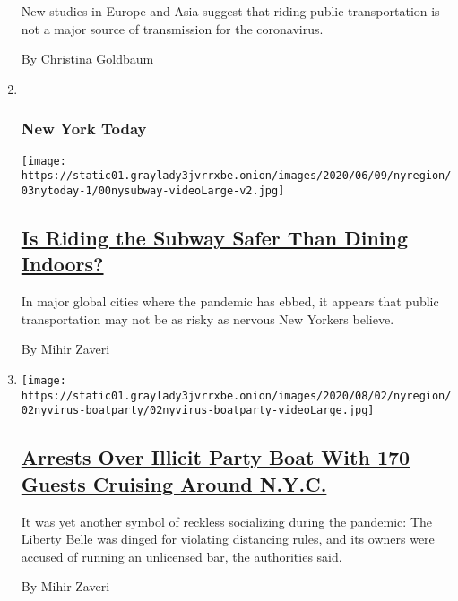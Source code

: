 \begin{enumerate}
  New studies in Europe and Asia suggest that riding public
  transportation is not a major source of transmission for the
  coronavirus.

  By Christina Goldbaum
\item ~
  \hypertarget{new-york-today}{%
  \subsubsection{New York Today}\label{new-york-today}}

  \texttt{[image: https://static01.graylady3jvrrxbe.onion/images/2020/06/09/nyregion/03nytoday-1/00nysubway-videoLarge-v2.jpg]}

  \hypertarget{is-riding-the-subway-safer-than-dining-indoors}{%
  \subsection{\texorpdfstring{\href{/2020/08/03/nyregion/nyc-subway-coronavirus.html}{Is
  Riding the Subway Safer Than Dining
  Indoors?}}{Is Riding the Subway Safer Than Dining Indoors?}}\label{is-riding-the-subway-safer-than-dining-indoors}}

  In major global cities where the pandemic has ebbed, it appears that
  public transportation may not be as risky as nervous New Yorkers
  believe.

  By Mihir Zaveri
\item
  \texttt{[image: https://static01.graylady3jvrrxbe.onion/images/2020/08/02/nyregion/02nyvirus-boatparty/02nyvirus-boatparty-videoLarge.jpg]}

  \hypertarget{arrests-over-illicit-party-boat-with-170-guests-cruising-around-nyc}{%
  \subsection{\texorpdfstring{\href{/2020/08/02/nyregion/liberty-belle-illegal-party.html}{Arrests
  Over Illicit Party Boat With 170 Guests Cruising Around
  N.Y.C.}}{Arrests Over Illicit Party Boat With 170 Guests Cruising Around N.Y.C.}}\label{arrests-over-illicit-party-boat-with-170-guests-cruising-around-nyc}}

  It was yet another symbol of reckless socializing during the pandemic:
  The Liberty Belle was dinged for violating distancing rules, and its
  owners were accused of running an unlicensed bar, the authorities
  said.

  By Mihir Zaveri
\end{enumerate}

